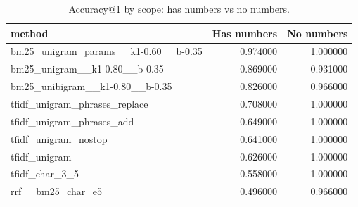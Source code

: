 \begin{table}
\caption{Accuracy@1 by scope: has numbers vs no numbers.}
\label{tab:acc1}
\begin{tabular}{lrr}
\toprule
method & Has numbers & No numbers \\
\midrule
bm25_unigram_params__k1-0.60__b-0.35 & 0.974000 & 1.000000 \\
bm25_unigram__k1-0.80__b-0.35 & 0.869000 & 0.931000 \\
bm25_unibigram__k1-0.80__b-0.35 & 0.826000 & 0.966000 \\
tfidf_unigram_phrases_replace & 0.708000 & 1.000000 \\
tfidf_unigram_phrases_add & 0.649000 & 1.000000 \\
tfidf_unigram_nostop & 0.641000 & 1.000000 \\
tfidf_unigram & 0.626000 & 1.000000 \\
tfidf_char_3_5 & 0.558000 & 1.000000 \\
rrf__bm25_char_e5 & 0.496000 & 0.966000 \\
\bottomrule
\end{tabular}
\end{table}
